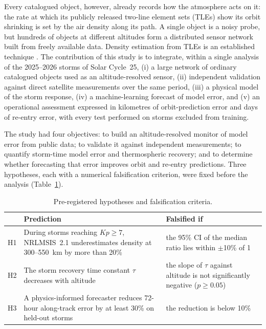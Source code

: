 \documentclass[11pt]{article}
\newcommand{\Kp}{\mathit{Kp}}
\begin{document}
Every catalogued object, however, already records how the atmosphere acts on it: the rate at which its publicly released two-line element sets (TLEs) show its orbit shrinking is set by the air density along its path. A single object is a noisy probe, but hundreds of objects at different altitudes form a distributed sensor network built from freely available data. Density estimation from TLEs is an established technique \citep{picone2005,doornbos2008,emmert2015}. The contribution of this study is to integrate, within a single analysis of the 2025--2026 storms of Solar Cycle~25, (i) a large network of ordinary catalogued objects used as an altitude-resolved sensor, (ii) independent validation against direct satellite measurements over the same period, (iii) a physical model of the storm response, (iv) a machine-learning forecast of model error, and (v) an operational assessment expressed in kilometres of orbit-prediction error and days of re-entry error, with every test performed on storms excluded from training.

The study had four objectives: to build an altitude-resolved monitor of model error from public data; to validate it against independent measurements; to quantify storm-time model error and thermospheric recovery; and to determine whether forecasting that error improves orbit and re-entry predictions. Three hypotheses, each with a numerical falsification criterion, were fixed before the analysis (Table~\ref{tab:hyp}).

\begin{table}[!htbp]
\centering\small
\caption{Pre-registered hypotheses and falsification criteria.}\label{tab:hyp}
\begin{tabular}{@{}l>{\raggedright}p{7.4cm}>{\raggedright\arraybackslash}p{5.2cm}@{}}
\toprule
 & Prediction & Falsified if \\
\midrule
H1 & During storms reaching $\Kp \geq 7$, NRLMSIS~2.1 underestimates density at 300--550~km by more than 20\% & the 95\% CI of the median ratio lies within $\pm$10\% of 1 \\
H2 & The storm recovery time constant $\tau$ decreases with altitude & the slope of $\tau$ against altitude is not significantly negative ($p \geq 0.05$) \\
H3 & A physics-informed forecaster reduces 72-hour along-track error by at least 30\% on held-out storms & the reduction is below 10\% \\
\bottomrule
\end{tabular}
\end{table}
\end{document}
